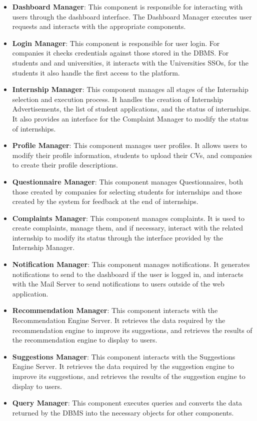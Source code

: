 \begin{itemize}
      \item \textbf{Dashboard Manager}: This component is responsible for interacting with users through the dashboard interface.
            The Dashboard Manager executes user requests and interacts with the appropriate components.
      \item \textbf{Login Manager}: This component is responsible for user login. For companies it checks credentials
            against those stored in the DBMS. For students and and universities, it interacts with the Universities SSOs,
            for the students it also handle the first access to the platform.
      \item \textbf{Internship Manager}: This component manages all stages of the Internship selection and execution process.
            It handles the creation of Internship Advertisements, the list of student applications,
            and the status of internships. It also provides an interface for the Complaint Manager to modify the status of internships.
      \item \textbf{Profile Manager}: This component manages user profiles. It allows users to modify their profile information,
            students to upload their CVs, and companies to create their profile descriptions.
      \item \textbf{Questionnaire Manager}: This component manages Questionnaires, both those created by companies for selecting students for internships
            and those created by the system for feedback at the end of internships.
      \item \textbf{Complaints Manager}: This component manages complaints. It is used to create complaints, manage them, and if necessary,
            interact with the related internship to modify its status through the interface provided by the Internship Manager.
      \item \textbf{Notification Manager}: This component manages notifications. It generates notifications to send to the
            dashboard if the user is logged in, and interacts with the Mail Server to send notifications to users outside of the web application.
      \item \textbf{Recommendation Manager}: This component interacts with the Recommendation Engine Server. It retrieves the data
            required by the recommendation engine to improve its suggestions, and retrieves the results of the recommendation engine to display to users.
      \item \textbf{Suggestions Manager}: This component interacts with the Suggestions Engine Server. It retrieves the data
            required by the suggestion engine to improve its suggestions, and retrieves the results of the suggestion engine to display to users.
      \item \textbf{Query Manager}: This component executes queries and converts the data returned by the DBMS into the necessary objects for other components.
\end{itemize}

